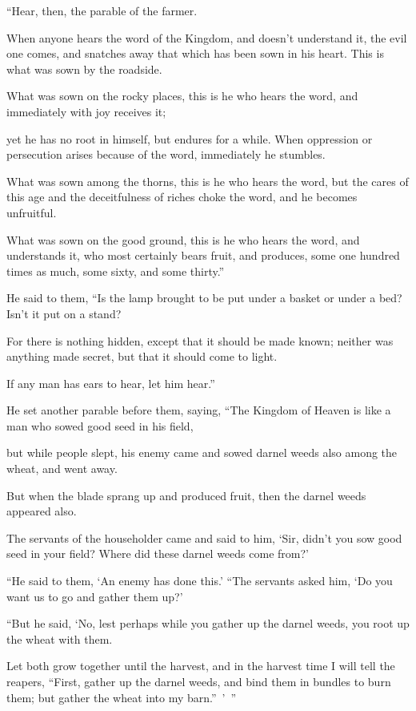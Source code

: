 “Hear, then, the parable of the farmer.

When anyone hears the word of the Kingdom, and doesn’t understand it, the evil one comes, and snatches away that which has been sown in his heart. This is what was sown by the roadside.

What was sown on the rocky places, this is he who hears the word, and immediately with joy receives it;

yet he has no root in himself, but endures for a while. When oppression or persecution arises because of the word, immediately he stumbles.

What was sown among the thorns, this is he who hears the word, but the cares of this age and the deceitfulness of riches choke the word, and he becomes unfruitful.

What was sown on the good ground, this is he who hears the word, and understands it, who most certainly bears fruit, and produces, some one hundred times as much, some sixty, and some thirty.”

He said to them, “Is the lamp brought to be put under a basket  or under a bed? Isn’t it put on a stand?

For there is nothing hidden, except that it should be made known; neither was anything made secret, but that it should come to light.

If any man has ears to hear, let him hear.”

He set another parable before them, saying, “The Kingdom of Heaven is like a man who sowed good seed in his field,

but while people slept, his enemy came and sowed darnel weeds also among the wheat, and went away.

But when the blade sprang up and produced fruit, then the darnel weeds appeared also.

The servants of the householder came and said to him, ‘Sir, didn’t you sow good seed in your field? Where did these darnel weeds come from?’

“He said to them, ‘An enemy has done this.’ “The servants asked him, ‘Do you want us to go and gather them up?’

“But he said, ‘No, lest perhaps while you gather up the darnel weeds, you root up the wheat with them.

Let both grow together until the harvest, and in the harvest time I will tell the reapers, “First, gather up the darnel weeds, and bind them in bundles to burn them; but gather the wheat into my barn.” ’ ”



